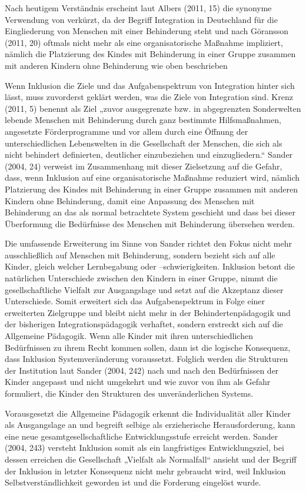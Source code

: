 Nach heutigem Verständnis erscheint laut Albers (2011, 15) die synonyme Verwendung von  verkürzt, da der Begriff Integration in Deutschland für die Eingliederung von Menschen mit einer Behinderung steht und nach Göransson (2011, 20) oftmals nicht mehr als eine organisatorische Maßnahme impliziert, nämlich die Platzierung des Kindes mit Behinderung in einer Gruppe zusammen mit anderen Kindern ohne Behinderung wie oben beschrieben

Wenn Inklusion die Ziele und das Aufgabenspektrum von Integration hinter sich lässt, muss zuvorderst geklärt werden, was die Ziele von Integration sind. 
Krenz (2011, 5) benennt als Ziel „zuvor ausgegrenzte bzw. in abgegrenzten Sonderwelten lebende Menschen mit Behinderung durch ganz bestimmte Hilfsmaßnahmen, angesetzte Förderprogramme und vor allem durch eine Öffnung der unterschiedlichen Lebenswelten in die Gesellschaft der Menschen, die sich als nicht behindert definierten, deutlicher einzubeziehen und einzugliedern.“ Sander (2004, 24) verweist im Zusammenhang mit dieser Zielsetzung auf die Gefahr, dass, wenn Inklusion auf eine organisatorische Maßnahme reduziert wird, nämlich Platzierung des Kindes mit Behinderung in einer Gruppe zusammen mit anderen Kindern ohne Behinderung, damit eine Anpassung des Menschen mit Behinderung an das als normal betrachtete System geschieht und dass bei dieser Überformung die Bedürfnisse des Menschen mit Behinderung übersehen werden. 

Die umfassende Erweiterung im Sinne von Sander richtet den Fokus nicht mehr ausschließlich auf Menschen mit Behinderung, sondern bezieht sich auf alle Kinder, gleich welcher Lernbegabung oder --schwierigkeiten. Inklusion betont die natürlichen Unterschiede zwischen den Kindern in einer Gruppe, nimmt die gesellschaftliche Vielfalt zur Ausgangslage und setzt auf die Akzeptanz dieser Unterschiede. Somit erweitert sich das Aufgabenspektrum in Folge einer erweiterten Zielgruppe und bleibt nicht mehr in der Behindertenpädagogik und der bisherigen Integrationspädagogik verhaftet, sondern erstreckt sich auf die Allgemeine Pädagogik. Wenn alle Kinder mit ihren unterschiedlichen Bedürfnissen zu ihrem Recht kommen sollen, dann ist die logische Konsequenz, dass Inklusion Systemveränderung voraussetzt. Folglich werden die Strukturen der Institution laut Sander (2004, 242) nach und nach den Bedürfnissen der Kinder angepasst und nicht umgekehrt und wie zuvor von ihm als Gefahr formuliert, die Kinder den Strukturen des unveränderlichen Systems.

Vorausgesetzt die Allgemeine Pädagogik erkennt die Individualität aller Kinder als Ausgangslage an und begreift selbige als erzieherische Herausforderung, kann eine neue gesamtgesellschaftliche Entwicklungsstufe erreicht werden. Sander (2004, 243) versteht Inklusion somit als ein langfristiges Entwicklungsziel, bei dessen erreichen die Gesellschaft „Vielfalt als Normalfall“ ansieht und der Begriff der Inklusion in letzter Konsequenz nicht mehr gebraucht wird, weil Inklusion Selbstverständlichkeit geworden ist und die Forderung eingelöst wurde.  

